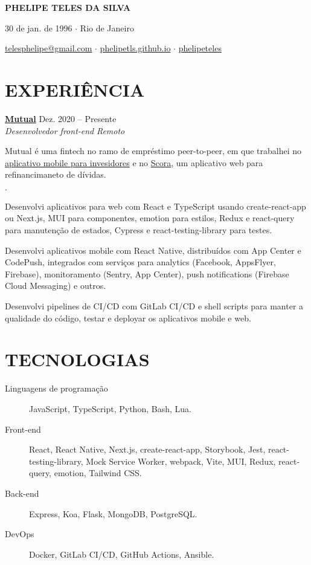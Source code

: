 \documentclass[12pt]{article}
\newenvironment{tightlist}
  {\begin{list}
    {$\cdot$}
    {
      \setlength{\leftmargin}{0em}
      \setlength{\itemsep}{\smallskipamount}
    }
  }
{\end{list}}
\begin{document}
\pagestyle{empty}

\centerline{\huge\bf PHELIPE TELES DA SILVA}
\medskip

\centerline{30 de jan. de 1996 $\cdot$ Rio de Janeiro}
\smallskip

\centerline{
  \href{mailto:telesphelipe@gmail.com}{ telesphelipe@gmail.com}
  $\cdot$
  \href{https://phelipetls.github.io}{ phelipetls.github.io}
  $\cdot$
  \href{https://linkedin.com/in/phelipeteles}{ phelipeteles}
}
\smallskip

\section*{EXPERIÊNCIA}

\textbf{\href{https://mutual.club}{Mutual}} \hfill Dez. 2020 -- Presente \\
\textit{Desenvolvedor front-end} \hfill \textit{Remoto} {\parfillskip=0pt\par}

Mutual é uma fintech no ramo de empréstimo peer-to-peer, em que trabalhei no
\href{https://mutual.club/en/invest.html}{aplicativo mobile para invesidores} e
no \href{https://scora.com.br/}{Scora}, um aplicativo web para refinancimaneto
de dívidas.

\begin{tightlist}
  \item Desenvolvi aplicativos para web com React e TypeScript usando
    create-react-app ou Next.js, MUI para componentes, emotion para
    estilos, Redux e react-query para manutenção de estados, Cypress e
    react-testing-library para testes.
  \item Desenvolvi aplicativos mobile com React Native, distribuídos com App
    Center e CodePush, integrados com serviços para analytics (Facebook,
    AppsFlyer, Firebase), monitoramento (Sentry, App Center), push notifications
    (Firebase Cloud Messaging) e outros.
  \item Desenvolvi pipelines de CI/CD com GitLab CI/CD e shell scripts para
    manter a qualidade do código, testar e deployar os aplicativos mobile e
    web.
\end{tightlist}

\section*{TECNOLOGIAS}

\begin{description}
  \item[Linguagens de programação] JavaScript, TypeScript, Python, Bash, Lua.
  \item[Front-end] React, React Native, Next.js, create-react-app, Storybook,
    Jest, react-testing-library, Mock Service Worker, webpack, Vite, MUI, Redux,
    react-query, emotion, Tailwind CSS.
  \item[Back-end] Express, Koa, Flask, MongoDB, PostgreSQL.
  \item[DevOps] Docker, GitLab CI/CD, GitHub Actions, Ansible.
\end{description}
\end{document}
